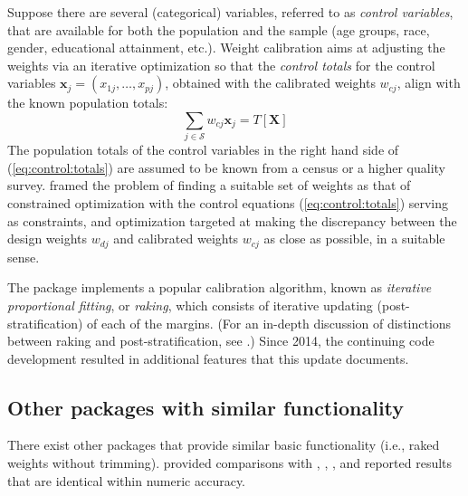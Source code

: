 Suppose there are several (categorical) variables, referred to
as {\it control variables}, that are available for both
the population and the sample
(age groups, race, gender, educational attainment, etc.).
Weight calibration aims at adjusting the weights
via an iterative optimization
so that the {\it control totals} for the control variables
$\mathbf{x}_j=(x_{1j}, \ldots, x_{pj})$, obtained with the calibrated
weights $w_{cj}$, align with the known population totals:
\begin{equation}
    \sum_{j \in \mathcal{S}} w_{cj} \mathbf{x}_j
    = T [ \mathbf{X}  ]
    \label{eq:control:totals}
\end{equation}
The population totals of the control variables in the right hand side
of (\ref{eq:control:totals}) are assumed to be known from a census or a higher quality survey.
\citet{deville:sarndal:1992} framed the problem of finding a suitable
set of weights as that of constrained optimization with the control
equations (\ref{eq:control:totals}) serving as constraints,
and optimization targeted at making the discrepancy between
the design weights $w_{dj}$ and calibrated weights
$w_{cj}$ as close as possible, in a suitable sense.

The package  \citep{kolenikov:2014} implements
a popular calibration algorithm, known as \textit{iterative proportional fitting},
or \textit{raking}, which consists of iterative updating (post-stratification) of
each of the margins. (For an in-depth discussion of distinctions between
raking and post-stratification, see \citet{kolenikov:2016}.)
Since 2014, the continuing code development resulted
in additional features that this update documents.

\subsection{Other packages with similar functionality}

There exist other packages that provide similar basic functionality 
(i.e., raked weights without trimming).
\citet{kolenikov:2014} provided comparisons with 
 \citep{winter:2002},  \citep{bergmann:2011},
 \citep{wittenberg:2010}, and reported results that
are identical within numeric accuracy. 

